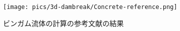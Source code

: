 \begin{figure}[H]
	\centering
	\texttt{[image: pics/3d-dambreak/Concrete-reference.png]}
	\caption{ビンガム流体の計算の参考文献の結果\cite{Saito2012}}
	\label{fig:3d-dambreak-concrete-reference}
\end{figure}

